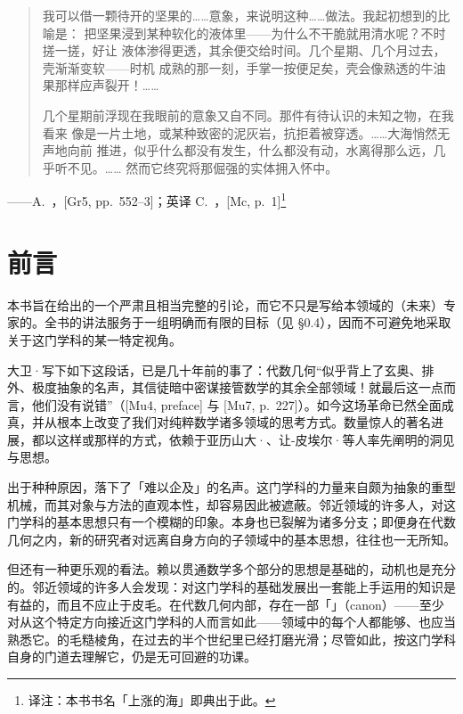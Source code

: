 
\thispagestyle{empty}
\vspace*{0.30\textheight}
\begin{quote}\kaishu
  我可以借一颗待开的坚果的……意象，来说明这种……做法。我起初想到的比喻是：
  把坚果浸到某种软化的液体里——为什么不干脆就用清水呢？不时搓一搓，好让
  液体渗得更透，其余便交给时间。几个星期、几个月过去，壳渐渐变软——时机
  成熟的那一刻，手掌一按便足矣，壳会像熟透的牛油果那样应声裂开！……

  几个星期前浮现在我眼前的意象又自不同。那件有待认识的未知之物，在我看来
  像是一片土地，或某种致密的泥灰岩，抗拒着被穿透。……大海悄然无声地向前
  推进，似乎什么都没有发生，什么都没有动，水离得那么远，几乎听不见。……
  然而它终究将那倔强的实体拥入怀中。
\end{quote}
\vspace{1em}
\begin{flushright}\kaishu\small
  ——A.~\trGrothendieck，[Gr5, pp.~552--3]；英译 C.~\trMcLarty，[Mc, p.~1]\footnote{译注：本书书名「上涨的海」即典出于此。}
\end{flushright}
\vspace{2em}
\clearpage

\chapter*{前言}
%
\setcounter{chapter}{0}

本书旨在给出\trAlgebraicGeometry{}的一个严肃且相当完整的引论，而它不只是写给本领域的（未来）专家的。全书的讲法服务于一组明确而有限的目标（见 \S0.4），因而不可避免地采取关于这门学科的某一特定视角。

大卫·\trMumford{}写下如下这段话，已是几十年前的事了：代数几何“似乎背上了玄奥、排外、极度抽象的名声，其信徒暗中密谋接管数学的其余全部领域！就最后这一点而言，他们没有说错”（[Mu4, preface] 与 [Mu7, p.~227]）。如今这场革命已然全面成真，并从根本上改变了我们对纯粹数学诸多领域的思考方式。数量惊人的著名进展，都以这样或那样的方式，依赖于亚历山大·\trGrothendieck{}、让-皮埃尔·\trSerre{}等人率先阐明的洞见与思想。

出于种种原因，\trAlgebraicGeometry{}落下了「难以企及」的名声。这门学科的力量来自颇为抽象的重型机械，而其对象与方法的直观本性，却容易因此被遮蔽。邻近领域的许多人，对这门学科的基本思想只有一个模糊的印象。\trAlgebraicGeometry{}本身也已裂解为诸多分支；即便身在代数几何之内，新的研究者对远离自身方向的子领域中的基本思想，往往也一无所知。

但还有一种更乐观的看法。\trAlgebraicGeometry{}赖以贯通数学多个部分的思想是基础的，动机也是充分的。邻近领域的许多人会发现：对这门学科的基础发展出一套能上手运用的知识是有益的，而且不应止于皮毛。在代数几何内部，存在一部「\trCanon{}」（canon）——至少对从这个特定方向接近这门学科的人而言如此——领域中的每个人都能够、也应当熟悉它。\trSchemeTheory{}的毛糙棱角，在过去的半个世纪里已经打磨光滑；尽管如此，按这门学科自身的门道去理解它，仍是无可回避的功课。

